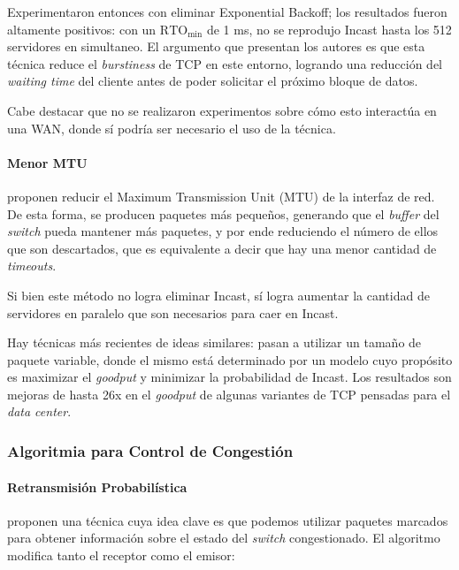 \documentclass[runningheads,a4paper]{llncs}
\begin{document}
Experimentaron entonces con eliminar Exponential Backoff; los resultados fueron altamente positivos: con un $\text{RTO}_{\text{min}}$ de 1 ms, no se reprodujo Incast hasta los 512 servidores en simultaneo. El argumento que presentan los autores es que esta técnica reduce el \textit{burstiness} de TCP en este entorno, logrando una reducción del \textit{waiting time} del cliente antes de poder solicitar el próximo bloque de datos.

Cabe destacar que no se realizaron experimentos sobre cómo esto interactúa en una WAN, donde sí podría ser necesario el uso de la técnica.

\paragraph{Menor MTU}

\citet{Zhang_MTU_2011} proponen reducir el Maximum Transmission Unit (MTU) de la interfaz de red. De esta forma, se producen paquetes más pequeños, generando que el \textit{buffer} del \textit{switch} pueda mantener más paquetes, y por ende reduciendo el número de ellos que son descartados, que es equivalente a decir que hay una menor cantidad de \textit{timeouts}.

Si bien este método no logra eliminar Incast, sí logra aumentar la cantidad de servidores en paralelo que son necesarios para caer en Incast.

Hay técnicas más recientes \cite{Huang_MTUVarV1_2015} \cite{Huang_MTUVar_2018} de ideas similares: pasan a utilizar un tamaño de paquete variable, donde el mismo está determinado por un modelo cuyo propósito es maximizar el \textit{goodput} y minimizar la probabilidad de Incast. Los resultados son mejoras de hasta 26x en el \textit{goodput} de algunas variantes de TCP pensadas para el \textit{data center}.

\subsubsection{Algoritmia para Control de Congestión}


\paragraph{Retransmisión Probabilística}

\citet{Kulkarni_Probabilistic_2011} proponen una técnica cuya idea clave es que podemos utilizar paquetes marcados para obtener información sobre el estado del \textit{switch} congestionado. El algoritmo modifica tanto el receptor como el emisor:
\end{document}
